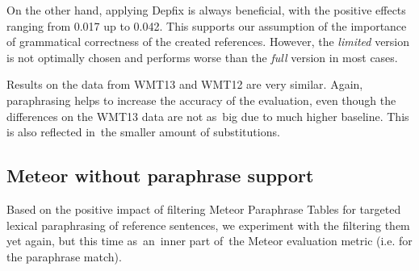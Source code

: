 \documentclass[11pt]{article}
\begin{document}
\begin{table}[tb]
\begin{center}
\vspace{10pt}

\caption{Average number of replaced words/phrases.}
\label{replaced}
\end{center}
\end{table}

On the other hand, applying Depfix is always beneficial, with the positive 
effects ranging from 0.017 up to 0.042. This supports our assumption of the 
importance of grammatical correctness of the created references. However, the 
\textit{limited} version is not optimally chosen and performs worse than the 
\textit{full} version in most cases.

Results on the data from WMT13 and WMT12 are very similar. Again, paraphrasing 
helps to increase the accuracy of the evaluation, even though the differences 
on the WMT13 data are not as~big due to much higher baseline. This is also 
reflected in~the smaller amount of substitutions.

\subsection{Meteor without paraphrase support}
\label{parmesan}
Based on the positive impact of filtering Meteor Paraphrase Tables for targeted
lexical paraphrasing of reference sentences, we experiment with the filtering 
them yet again, but this time as~an~inner part of~the Meteor evaluation metric 
(i.e. for the paraphrase match).
\end{document}
